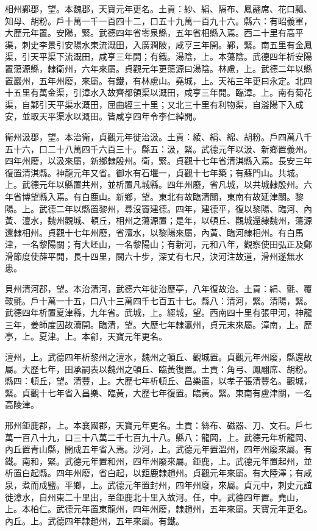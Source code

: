 \begin{pinyinscope}
 相州鄴郡，望。本魏郡，天寶元年更名。土貢：紗、絹、隔布、鳳翮席、花口瓢、知母、胡粉。戶十萬一千一百四十二，口五十九萬一百九十六。縣六：有昭義軍，大歷元年置。安陽，緊。武德四年省零泉縣，五年省相縣入焉。西二十里有高平渠，刺史李景引安陽水東流溉田，入廣潤陂，咸亨三年開。鄴，緊。南五里有金鳳渠，引天平渠下流溉田，咸亨三年開；有鐵。湯陰，上。本蕩陰。武德四年析安陽置蕩源縣，隸衛州，六年來屬。貞觀元年更蕩源曰湯陰。林慮，上。武德二年以縣置巖州，五年州廢，來屬。有鐵，有林慮山。堯城，上。天祐三年更曰永定。北四十五里有萬金渠，引漳水入故齊都領渠以溉田，咸亨三年開。臨漳。上。南有菊花渠，自鄴引天平渠水溉田，屈曲經三十里；又北三十里有利物渠，自滏陽下入成安，並取天平渠水以溉田。皆咸亨四年令李仁綽開。



 衛州汲郡，望。本治衛，貞觀元年徙治汲。土貢：綾、絹、綿、胡粉。戶四萬八千五十六，口二十八萬四千六百三十。縣五：汲，緊。武德元年以汲、新鄉置義州。四年州廢，以汲來屬，新鄉隸殷州。衛，緊。貞觀十七年省清淇縣入焉。長安三年復置清淇縣。神龍元年又省。御水有石堰一，貞觀十七年築；有蘇門山。共城。上。武德元年以縣置共州，並析置凡城縣。四年州廢，省凡城，以共城隸殷州。六年省博望縣入焉。有白鹿山。新鄉，望。東北有故臨清關，東南有故延津關。黎陽。上。武德二年以縣置黎州，尋沒竇建德。四年，建德平，復以黎陽、臨河、內黃、澶水，魏州觀城、頓丘，相州之蕩源置；是年，以頓丘、觀城還隸魏州，蕩源還隸相州。貞觀十七年州廢，省澶水，以黎陽來屬，內黃、臨河隸相州。有白馬津，一名黎陽關；有大岯山，一名黎陽山；有新河，元和八年，觀察使田弘正及鄭滑節度使薛平開，長十四里，闊六十步，深丈有七尺，決河注故道，滑州遂無水患。



 貝州清河郡，望。本治清河，武德六年徙治歷亭，八年復故治。土貢：絹、氈、覆鞍氈。戶十萬一十五，口八十三萬四千七百五十七。縣八：清河，緊。清陽，緊。武德四年析置夏津縣，九年省。武城，上。經城，望。西南四十里有張甲河，神龍三年，姜師度因故瀆開。臨清，望。大歷七年隸瀛州，貞元末來屬。漳南，上。歷亭，上。夏津。上。本鄃，天寶元年更名。



 澶州，上。武德四年析黎州之澶水，魏州之頓丘、觀城置。貞觀元年州廢，縣還故屬。大歷七年，田承嗣表以魏州之頓丘、臨黃復置。土貢：角弓、鳳翮席、胡粉。縣四：頓丘，望。清豐，上。大歷七年析頓丘、昌樂置，以孝子張清豐名。觀城，緊。貞觀十七年省入昌樂、臨黃，大歷七年復置。臨黃。緊。東南有盧津關，一名高陵津。



 邢州鉅鹿郡，上。本襄國郡，天寶元年更名。土貢：絲布、磁器、刀、文石。戶七萬一百八十九，口三十八萬二千七百九十八。縣八：龍岡，上。武德元年析龍岡、內丘置青山縣，開成五年省入焉。沙河，上。武德元年置溫州，四年州廢來屬。有鐵。南和，緊。武德元年置和州，四年州廢來屬。鉅鹿，上。武德元年置起州，並析置白起縣。四年州廢，省白起，以鉅鹿隸趙州。貞觀元年來屬。有大陸澤；有咸泉，煮而成鹽。平鄉，上。武德元年置封州，四年州廢，來屬。貞元中，刺史元誼徙漳水，自州東二十里出，至鉅鹿北十里入故河。任，中。武德四年置。堯山，上。本柏仁。武德元年置東龍州，四年州廢，隸趙州，五年來屬。天寶元年更名。內丘。上。武德四年隸趙州，五年來屬。有鐵。




\end{pinyinscope}
